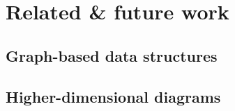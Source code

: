 
\section{Related \& future work} \label{section:related and future}

\subsection{Graph-based data structures}

\subsection{Higher-dimensional diagrams}
